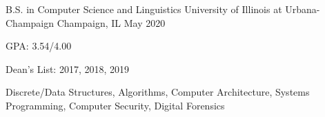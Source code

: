 

\begin{cventries}

  \cventry
    {B.S. in Computer Science and Linguistics} %
    {University of Illinois at Urbana-Champaign} %
    {Champaign, IL} %
    {May 2020} %
    {
      \begin{cvitems} %
        \item {GPA: 3.54/4.00}
        \item {Dean's List: 2017, 2018, 2019}
        \item {Discrete/Data Structures, Algorithms, Computer Architecture, Systems Programming, Computer Security, Digital Forensics}%
      \end{cvitems}
    }

\end{cventries}
